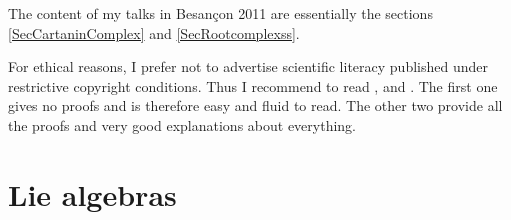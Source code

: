     \tableofcontents

    \newpage


\pagestyle{headings}




The content of my talks in Besançon 2011 are essentially the sections \ref{SecCartaninComplex} and \ref{SecRootcomplexss}. 

For ethical reasons, I prefer not to advertise scientific literacy published under restrictive copyright conditions. Thus I recommend to read \cite{Wisser}, \cite{SamelsonNotesLieAlg} and \cite{SternLieAlgebra}. The first one gives no proofs and is therefore easy and fluid to read. The other two provide all the proofs and very good explanations about everything.


\chapter{Lie algebras}




        \printnomenclature
        \printindex

